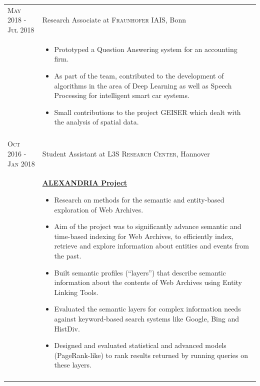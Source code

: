\documentclass[a4paper,10pt]{article} %
\begin{document}
\begin{longtable}{l p{11cm}}
\textsc{May 2018 - Jul 2018} & Research Associate at \textsc{Fraunhofer IAIS}, Bonn\\[-1em]
& {\footnotesize
  	\begin{itemize}
  		\setlength\itemsep{0.2em}
 		\item Prototyped a Question Answering system for an accounting firm.
		\item As part of the team, contributed to the development of algorithms in the area of Deep Learning as well as Speech Processing for intelligent smart car systems.
		\item Small contributions to the project GEISER which dealt with the analysis of spatial data. 
  \end{itemize}
  }\\
\multicolumn{2}{c}{} \\[-1.5em]


\textsc{Oct 2016 - Jan 2018} & Student Assistant at \textsc{L3S Research Center}, Hannover\\[1mm]
& \textbf{\footnotesize{\href{http://alexandria-project.eu/}{ALEXANDRIA Project}}}\vspace{0.2em}
  {\footnotesize
  	\begin{itemize}
  		\setlength\itemsep{0.2em}
 		\item Research on methods for the semantic and entity-based exploration of Web Archives. 
 		\item Aim of the project was to significantly advance semantic and time-based indexing for Web Archives, to efficiently index, retrieve and explore information about entities and events from the past.
		\item Built semantic profiles (“layers”) that describe semantic information about the
		contents of Web Archives using Entity Linking Tools.
		\item Evaluated the semantic layers for complex information needs against keyword-based search
systems like Google, Bing and HistDiv.
		\item Designed and evaluated statistical and advanced models (PageRank-like) to
		rank results returned by running queries on these layers.    
  \end{itemize}
  }\\
 \multicolumn{2}{c}{} \\[-1.5em]



\end{longtable}
\end{document}
